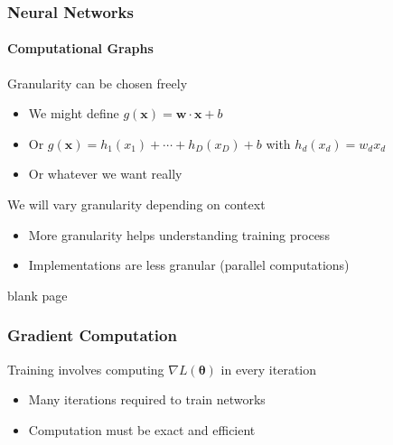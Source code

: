 \documentclass[xetex,professionalfont]{beamer}
\renewcommand{\vec}[1]{\ensuremath{\mathbf{#1}}}
\newcommand{\vw}{\vec{w}}
\newcommand{\vx}{\vec{x}}
\newcommand{\bth}{\boldsymbol{\theta}}
\begin{document}
\begin{frame}
\frametitle{Neural Networks}
\framesubtitle{Computational Graphs}

Granularity can be chosen freely %
\begin{itemize}
    \item We might define $g(\vx)=\vw\cdot\vx+b$
    \item Or $g(\vx)=h_1(x_1)+\cdots+h_D(x_D)+b$ with $h_d(x_d)=w_d x_d$
    \item Or whatever we want really %
\end{itemize}

\bigskip

We will vary granularity depending on context
\begin{itemize}
    \item More granularity helps understanding training process
    \item Implementations are less granular (parallel computations)
\end{itemize}

\end{frame}


{
\begin{frame}


\begin{center}
\textcolor[rgb]{0.9,0.9,0.9}{blank page}
\end{center}

\end{frame}
}


\begin{frame}
\frametitle{Gradient Computation}

Training involves computing $\nabla L(\bth)$ in every iteration
\begin{itemize}
  \item Many iterations required to train networks
  \item Computation must be exact and efficient
\end{itemize}

\end{frame}
\end{document}
